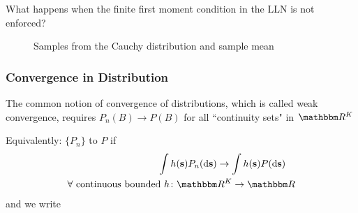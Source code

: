 \begin{frame}

    \vspace{2em}
    What happens when the finite first
    moment condition in the LLN is not enforced?
    
\end{frame}

\begin{frame}

    \vspace{2em}
    \begin{figure}
    \centering
    \caption{\label{f:cauchy_samples} Samples from the Cauchy distribution and sample mean}
    
\end{figure}

\end{frame}

\begin{frame}\frametitle{Convergence in Distribution}

    \vspace{2em}
    The common notion of convergence of distributions, which is
    called weak convergence, requires $P_n(B) \to P(B)$ for all
    ``continuity sets" in $\RR^K$
    
    \vspace{1em}
    Equivalently: $\{P_n\}$  to $P$ if
    \begin{align*}
        \int h(\bolds) P_n(\diff \bolds) \to \int h(\bolds) P(\diff \bolds)
        \quad 
        \\ \text{$\forall$ continuous bounded $h \colon \RR^K \to \RR$}
    \end{align*}
    and we write 
    
\end{frame}

